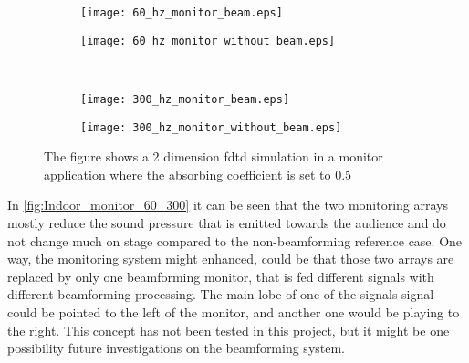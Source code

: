 \begin{figure}[H]
\begin{subfigure}[c]{0.5\textwidth}
\texttt{[image: 60\_hz\_monitor\_beam.eps]}
\label{fig:Indoor_monitor_60_on}
\end{subfigure}
\begin{subfigure}[c]{0.5\textwidth}
\texttt{[image: 60\_hz\_monitor\_without\_beam.eps]}
\label{fig:Indoor_monitor_60_off}
\end{subfigure}\\
\hspace{0.1\textheight}
\begin{subfigure}[c]{0.5\textwidth}
\texttt{[image: 300\_hz\_monitor\_beam.eps]}
\label{fig:Indoor_monitor_300_on}
\end{subfigure}
\begin{subfigure}[c]{0.5\textwidth}
\texttt{[image: 300\_hz\_monitor\_without\_beam.eps]}
\label{fig:Indoor_monitor_300_off}
\end{subfigure}
\caption{The figure shows a 2 dimension \gls{fdtd} simulation in a monitor application where the absorbing coefficient is set to 0.5}
		\label{fig:Indoor_monitor_60_300}
\end{figure}

In \autoref{fig:Indoor_monitor_60_300} it can be seen that the two monitoring arrays mostly reduce the sound pressure that is emitted towards the audience and do not change much on stage compared to the non-beamforming reference case. One way, the monitoring system might enhanced, could be that those two arrays are replaced by only one beamforming monitor, that is fed different signals with different beamforming processing. The main lobe of one of the signals signal could be pointed to the left of the monitor, and another one would be playing to the right. This concept has not been tested in this project, but it might be one possibility future investigations on the beamforming system.


